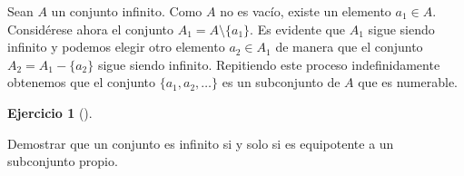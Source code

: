 \documentclass[
  a4paper,
]{scrreport}
\theoremstyle{definition}
\newtheorem{exercise}{Ejercicio}[chapter]
\theoremstyle{remark}
\begin{document}
\begin{tcolorbox}
\begin{tcolorbox}
\begin{tcolorbox}
\begin{tcolorbox}
\begin{tcolorbox}
\begin{tcolorbox}
\begin{tcolorbox}
\begin{tcolorbox}
\begin{tcolorbox}
\begin{tcolorbox}
\begin{tcolorbox}
\begin{tcolorbox}
\begin{tcolorbox}
\begin{tcolorbox}
\begin{tcolorbox}
\begin{tcolorbox}
\begin{tcolorbox}
\begin{tcolorbox}
\begin{tcolorbox}
\begin{tcolorbox}
\begin{tcolorbox}
\begin{tcolorbox}
\begin{tcolorbox}
\begin{tcolorbox}
\begin{tcolorbox}
\begin{tcolorbox}
\begin{tcolorbox}
\begin{tcolorbox}
\begin{tcolorbox}
\begin{tcolorbox}
\begin{tcolorbox}
Sean \(A\) un conjunto infinito. Como \(A\) no es vacío, existe un
elemento \(a_1\in A\). Considérese ahora el conjunto
\(A_1 = A\setminus \{a_1\}\). Es evidente que \(A_1\) sigue siendo
infinito y podemos elegir otro elemento \(a_2\in A_1\) de manera que el
conjunto \(A_2=A_1-\{a_2\}\) sigue siendo infinito. Repitiendo este
proceso indefinidamente obtenemos que el conjunto
\(\{a_1, a_2, \ldots\}\) es un subconjunto de \(A\) que es numerable.

\end{tcolorbox}

\begin{exercise}[]\protect\hypertarget{exr-conjunto-equipotente-subconjunto}{}\label{exr-conjunto-equipotente-subconjunto}

Demostrar que un conjunto es infinito si y solo si es equipotente a un
subconjunto propio.

\end{exercise}


\end{tcolorbox}
\end{tcolorbox}
\end{tcolorbox}
\end{tcolorbox}
\end{tcolorbox}
\end{tcolorbox}
\end{tcolorbox}
\end{tcolorbox}
\end{tcolorbox}
\end{tcolorbox}
\end{tcolorbox}
\end{tcolorbox}
\end{tcolorbox}
\end{tcolorbox}
\end{tcolorbox}
\end{tcolorbox}
\end{tcolorbox}
\end{tcolorbox}
\end{tcolorbox}
\end{tcolorbox}
\end{tcolorbox}
\end{tcolorbox}
\end{tcolorbox}
\end{tcolorbox}
\end{tcolorbox}
\end{tcolorbox}
\end{tcolorbox}
\end{tcolorbox}
\end{tcolorbox}
\end{tcolorbox}
\end{document}
